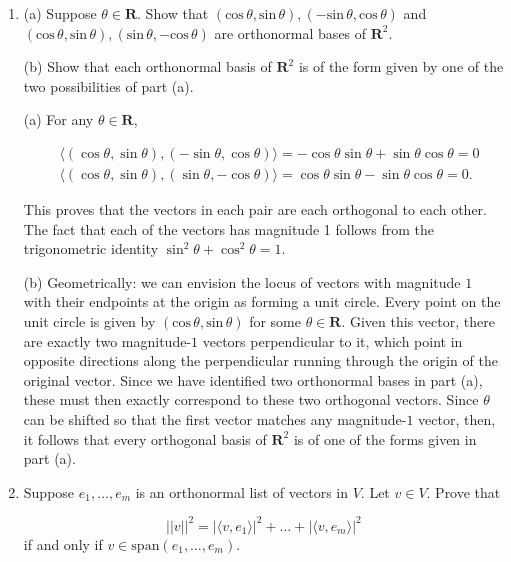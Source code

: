 \documentclass{book}
\begin{document}
\begin{enumerate}

\item (a) Suppose \(\theta \in \textbf{R}\).  Show that \((\textrm{cos} \, \theta,\textrm{sin} \, \theta),(-\textrm{sin} \, \theta,\textrm{cos} \, \theta)\) and \((\textrm{cos} \, \theta,\textrm{sin} \, \theta),(\textrm{sin} \, \theta,-\textrm{cos} \, \theta)\) are orthonormal bases of \(\textbf{R}^2\).

(b) Show that each orthonormal basis of \(\textbf{R}^2\) is of the form given by one of the two possibilities of part (a).

(a) For any \(\theta \in \textbf{R}\), 

\begin{equation*}
    \begin{split}
    & \langle (\cos \theta, \sin \theta), (- \sin \theta, \cos 
    \theta) \rangle = -\cos \theta \sin \theta + \sin \theta \cos \theta = 0 \\
    & \langle (\cos \theta, \sin \theta), (\sin \theta, -\cos 
    \theta) \rangle = \cos \theta \sin \theta - \sin \theta \cos \theta = 0.
    \end{split}
\end{equation*}

This proves that the vectors in each pair are each orthogonal to each other.  The fact that each of the vectors has magnitude 1 follows from the trigonometric identity \(\sin^2 \theta + \cos^2 \theta = 1\).

(b) Geometrically: we can envision the locus of vectors with magnitude \(1\) with their endpoints at the origin as forming a unit circle.  Every point on the unit circle is given by \((\text{cos} \, \theta,\text{sin} \, \theta)\) for some \(\theta \in \textbf{R}\).  Given this vector, there are exactly two magnitude-\(1\) vectors perpendicular to it, which point in opposite directions along the perpendicular running through the origin of the original vector. 
 Since we have identified two orthonormal bases in part (a), these must then exactly correspond to these two orthogonal vectors.  Since \(\theta\) can be shifted so that the first vector matches any magnitude-\(1\) vector, then, it follows that every orthogonal basis of \(\textbf{R}^2\) is of one of the forms given in part (a).

\item Suppose \(e_1,\dots,e_m\) is an orthonormal list of vectors in \(V\).  Let \(v \in V\).  Prove that

\begin{equation*}
    ||v||^2=|\langle v,e_1 \rangle |^2 + \dots + |\langle v,e_m \rangle |^2
\end{equation*}
if and only if \(v \in \textrm{span}(e_1,\dots,e_m)\).


\end{enumerate}
\end{document}
